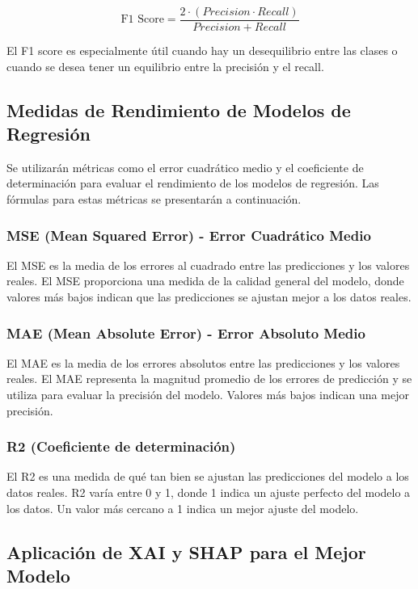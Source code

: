 \begin{equation}
\text{F1 Score} = \frac{2 \cdot (Precision \cdot Recall)}{Precision + Recall}
\end{equation}

El F1 score es especialmente útil cuando hay un desequilibrio entre las clases o cuando se desea tener un equilibrio entre la precisión y el recall.

\subsection{Medidas de Rendimiento de Modelos de Regresión}

Se utilizarán métricas como el error cuadrático medio y el coeficiente de determinación para evaluar el rendimiento de los modelos de regresión. Las fórmulas para estas métricas se presentarán a continuación.

\subsubsection{MSE (Mean Squared Error) - Error Cuadrático Medio}
El MSE es la media de los errores al cuadrado entre las predicciones y los valores reales. El MSE proporciona una medida de la calidad general del modelo, donde valores más bajos indican que las predicciones se ajustan mejor a los datos reales.

\subsubsection{MAE (Mean Absolute Error) - Error Absoluto Medio}
El MAE es la media de los errores absolutos entre las predicciones y los valores reales. El MAE representa la magnitud promedio de los errores de predicción y se utiliza para evaluar la precisión del modelo. Valores más bajos indican una mejor precisión.

\subsubsection{R2 (Coeficiente de determinación)}
El R2 es una medida de qué tan bien se ajustan las predicciones del modelo a los datos reales. R2 varía entre 0 y 1, donde 1 indica un ajuste perfecto del modelo a los datos. Un valor más cercano a 1 indica un mejor ajuste del modelo.

\subsection{Aplicación de XAI y SHAP para el Mejor Modelo}

